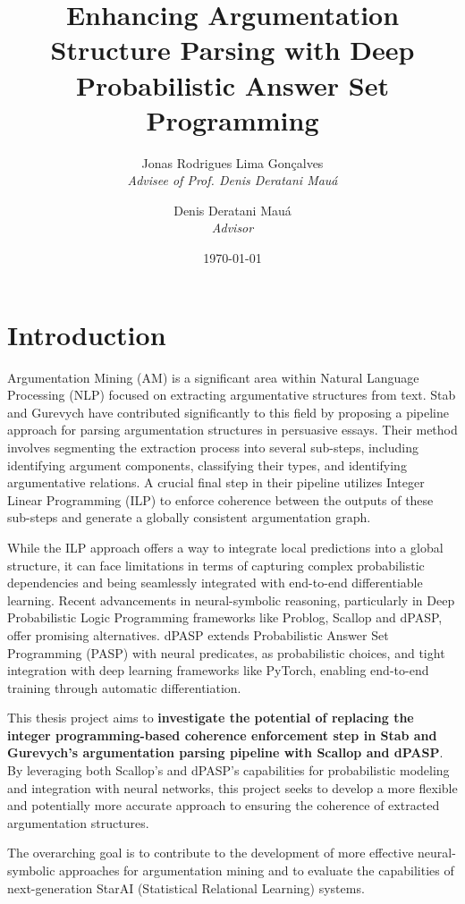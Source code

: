 \documentclass{article}
\title{Enhancing Argumentation Structure Parsing with Deep Probabilistic Answer
Set Programming}
\author{Jonas Rodrigues Lima Gonçalves \\ \textit{Advisee of Prof. Denis
Deratani Mauá} \and Denis Deratani Mauá \\ \textit{Advisor}}
\date{\today}
\begin{document}
\maketitle

\section{Introduction}

Argumentation Mining (AM) is a significant area within Natural Language
Processing (NLP) focused on extracting argumentative structures from text. Stab
and Gurevych have contributed significantly to this field by proposing a
pipeline approach for parsing argumentation structures in persuasive essays.
Their method involves segmenting the extraction process into several sub-steps,
including identifying argument components, classifying their types, and
identifying argumentative relations. A crucial final step in their pipeline
utilizes Integer Linear Programming (ILP) to enforce coherence between the
outputs of these sub-steps and generate a globally consistent argumentation
graph.

While the ILP approach offers a way to integrate local predictions into a global
structure, it can face limitations in terms of capturing complex probabilistic
dependencies and being seamlessly integrated with end-to-end differentiable
learning. Recent advancements in neural-symbolic reasoning, particularly in
Deep Probabilistic Logic Programming frameworks like Problog, Scallop and dPASP,
offer promising alternatives. dPASP extends Probabilistic Answer Set Programming
(PASP) with neural predicates, as probabilistic choices, and tight integration
with deep learning frameworks like PyTorch, enabling end-to-end training through
automatic differentiation.

This thesis project aims to \textbf{investigate the potential of replacing the
integer programming-based coherence enforcement step in Stab and Gurevych's
argumentation parsing pipeline with Scallop and dPASP}. By leveraging both
Scallop's and dPASP's capabilities for probabilistic modeling and integration
with neural networks, this project seeks to develop a more flexible and
potentially more accurate approach to ensuring the coherence of extracted
argumentation structures.

The overarching goal is to contribute to the development of more effective
neural-symbolic approaches for argumentation mining and to evaluate the
capabilities of next-generation StarAI (Statistical Relational Learning)
systems.
\end{document}
